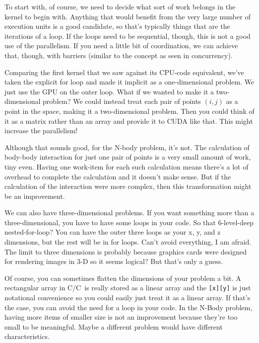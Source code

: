 \documentclass[a4paper]{report}
\newcommand{\CPP}{C\nolinebreak\hspace{-.05em}\raisebox{.4ex}{\tiny\bf +}\nolinebreak\hspace{-.10em}\raisebox{.4ex}{\tiny\bf +}}
\def\CPP{{C\nolinebreak[4]\hspace{-.05em}\raisebox{.4ex}{\tiny\bf ++}}}
\begin{document}
To start with, of course, we need to decide what sort of work belongs in the kernel to begin with. Anything that would benefit from the very large number of execution units is a good candidate, so that's typically things that are the iterations of a loop. If the loops need to be sequential, though, this is not a good use of the parallelism. If you need a little bit of coordination, we can achieve that, though, with barriers (similar to the concept as seen in concurrency). 

Comparing the first kernel that we saw against its CPU-code equivalent, we've taken the explicit for loop and made it implicit as a one-dimensional problem. We just use the GPU on the outer loop. What if we wanted to make it a two-dimensional problem? We could instead treat each pair of points $(i, j)$ as a point in the space, making it a two-dimensional problem. Then you could think of it as a matrix rather than an array and provide it to CUDA like that. This might increase the parallelism! 

Although that sounds good, for the N-body problem, it's not. The calculation of body-body interaction for just one pair of points is a very small amount of work, tiny even. Having one work-item for each such calculation means there's a lot of overhead to complete the calculation and it doesn't make sense. But if the calculation of the interaction were more complex, then this transformation might be an improvement.

We can also have three-dimensional problems. If you want something more than a three-dimensional, you have to have some loops in your code. So that 6-level-deep nested-for-loop? You can have the outer three loops as your x, y, and z dimensions, but the rest will be in for loops. Can't avoid everything, I am afraid. The limit to three dimensions is probably because graphics cards were designed for rendering images in 3-D so it seems logical? But that's only a guess.

Of course, you can sometimes flatten the dimensions of your problem a bit. A rectangular array in C/\CPP~is really stored as a linear array and the \texttt{[x][y]} is just notational convenience so you could easily just treat it as a linear array. If that's the case, you can avoid the need for a loop in your code. In the N-Body problem, having more items of smaller size is not an improvement because they're too small to be meaningful. Maybe a different problem would have different characteristics.
\end{document}
